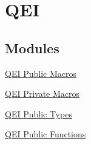 \hypertarget{group___q_e_i}{\section{\-Q\-E\-I}
\label{group___q_e_i}
}
\subsection*{\-Modules}
\begin{DoxyCompactItemize}
\item 
\hyperlink{group___q_e_i___public___macros}{\-Q\-E\-I Public Macros}
\item 
\hyperlink{group___q_e_i___private___macros}{\-Q\-E\-I Private Macros}
\item 
\hyperlink{group___q_e_i___public___types}{\-Q\-E\-I Public Types}
\item 
\hyperlink{group___q_e_i___public___functions}{\-Q\-E\-I Public Functions}
\end{DoxyCompactItemize}
